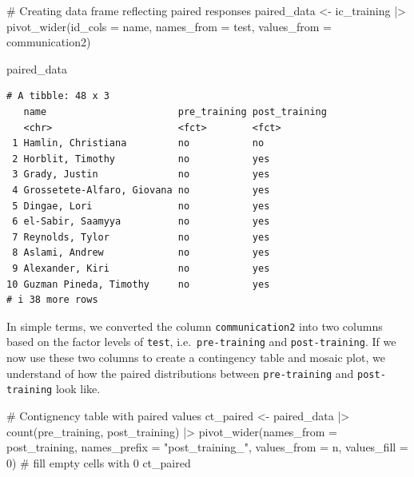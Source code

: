 \documentclass[
  letterpaper,
]{krantz}
\makeatletter
\newenvironment{Shaded}{\begin{snugshade}}{\end{snugshade}}
\newcommand{\AttributeTok}[1]{\textcolor[rgb]{0.40,0.45,0.13}{#1}}
\newcommand{\CommentTok}[1]{\textcolor[rgb]{0.37,0.37,0.37}{#1}}
\newcommand{\DecValTok}[1]{\textcolor[rgb]{0.68,0.00,0.00}{#1}}
\newcommand{\FunctionTok}[1]{\textcolor[rgb]{0.28,0.35,0.67}{#1}}
\newcommand{\NormalTok}[1]{\textcolor[rgb]{0.00,0.23,0.31}{#1}}
\newcommand{\OtherTok}[1]{\textcolor[rgb]{0.00,0.23,0.31}{#1}}
\newcommand{\SpecialCharTok}[1]{\textcolor[rgb]{0.37,0.37,0.37}{#1}}
\newcommand{\StringTok}[1]{\textcolor[rgb]{0.13,0.47,0.30}{#1}}
\newenvironment{kframe}{%
\medskip{}
\setlength{\fboxsep}{.8em}
 \def\at@end@of@kframe{}%
 \ifinner\ifhmode%
  \def\at@end@of@kframe{\end{minipage}}%
  \begin{minipage}{\columnwidth}%
 \fi\fi%
 \def\FrameCommand##1{\hskip\@totalleftmargin \hskip-\fboxsep
 \colorbox{shadecolor}{##1}\hskip-\fboxsep
     \hskip-\linewidth \hskip-\@totalleftmargin \hskip\columnwidth}%
 \MakeFramed {\advance\hsize-\width
   \@totalleftmargin\z@ \linewidth\hsize
   \@setminipage}}%
 {\par\unskip\endMakeFramed%
 \at@end@of@kframe}
\renewenvironment{Shaded}{\begin{kframe}}{\end{kframe}}
\makeatother
\begin{document}
\begin{Shaded}
\begin{Highlighting}[]
\CommentTok{\# Creating data frame reflecting paired responses}
\NormalTok{paired\_data }\OtherTok{\textless{}{-}}
\NormalTok{  ic\_training }\SpecialCharTok{|\textgreater{}}
  \FunctionTok{pivot\_wider}\NormalTok{(}\AttributeTok{id\_cols =}\NormalTok{ name,}
              \AttributeTok{names\_from =}\NormalTok{ test,}
              \AttributeTok{values\_from =}\NormalTok{ communication2)}

\NormalTok{paired\_data}
\end{Highlighting}
\end{Shaded}

\begin{verbatim}
# A tibble: 48 x 3
   name                       pre_training post_training
   <chr>                      <fct>        <fct>        
 1 Hamlin, Christiana         no           no           
 2 Horblit, Timothy           no           yes          
 3 Grady, Justin              no           yes          
 4 Grossetete-Alfaro, Giovana no           yes          
 5 Dingae, Lori               no           yes          
 6 el-Sabir, Saamyya          no           yes          
 7 Reynolds, Tylor            no           yes          
 8 Aslami, Andrew             no           yes          
 9 Alexander, Kiri            no           yes          
10 Guzman Pineda, Timothy     no           yes          
# i 38 more rows
\end{verbatim}

In simple terms, we converted the column \texttt{communication2} into
two columns based on the factor levels of \texttt{test},
i.e.~\texttt{pre-training} and \texttt{post-training}. If we now use
these two columns to create a contingency table and mosaic plot, we
understand of how the paired distributions between \texttt{pre-training}
and \texttt{post-training} look like.

\begin{Shaded}
\begin{Highlighting}[]
\CommentTok{\# Contignency table with paired values}
\NormalTok{ct\_paired }\OtherTok{\textless{}{-}}
\NormalTok{  paired\_data }\SpecialCharTok{|\textgreater{}}
  \FunctionTok{count}\NormalTok{(pre\_training, post\_training) }\SpecialCharTok{|\textgreater{}}
  \FunctionTok{pivot\_wider}\NormalTok{(}\AttributeTok{names\_from =}\NormalTok{ post\_training,}
              \AttributeTok{names\_prefix =} \StringTok{"post\_training\_"}\NormalTok{,}
              \AttributeTok{values\_from =}\NormalTok{ n,}
              \AttributeTok{values\_fill =} \DecValTok{0}\NormalTok{) }\CommentTok{\# fill empty cells with \textquotesingle{}0\textquotesingle{}}
\NormalTok{ct\_paired}
\end{Highlighting}
\end{Shaded}
\end{document}

